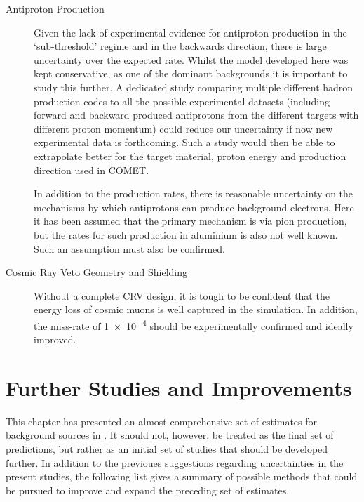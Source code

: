 \begin{description}
\item[Antiproton Production]
Given the lack of experimental evidence for antiproton production in the `sub-threshold' regime and in the backwards direction, there is large uncertainty over the expected rate.
Whilst the model developed here was kept conservative, as one of the dominant backgrounds it is important to study this further.
A dedicated study comparing multiple different hadron production codes to all the possible experimental datasets (including forward and backward produced antiprotons from the different targets with different proton momentum) could reduce our uncertainty if now new experimental data is forthcoming.
Such a study would then be able to extrapolate better for the target material, proton energy and production direction used in COMET.

In addition to the production rates, there is reasonable uncertainty on the mechanisms by which antiprotons can produce background electrons.
Here it has been assumed that the primary mechanism is via pion production, but the rates for such production in aluminium is also not well known.
Such an assumption must also be confirmed.

\item[Cosmic Ray Veto Geometry and Shielding]
Without a complete \ac{CRV} design, it is tough to be confident that the energy loss of cosmic muons is well captured in the \phaseII simulation.
In addition, the miss-rate of \num{1e-4} should be experimentally confirmed and ideally improved.
\end{description}

\section{Further Studies and Improvements}
This chapter has presented an almost comprehensive set of estimates for background sources in \phaseII.
It should not, however, be treated as the final set of predictions, but rather as an initial set of studies that should be developed further.
In addition to the previoues suggestions regarding uncertainties in the present studies,
the following list gives a summary of possible methods that could be pursued to improve and expand the preceding set of estimates.

